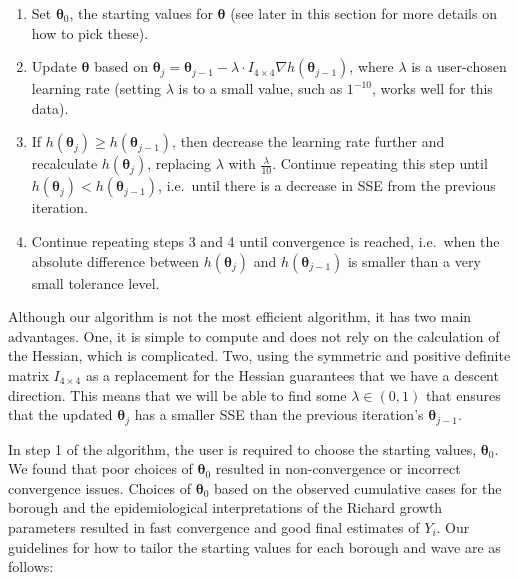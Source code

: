 \documentclass[
]{article}
\providecommand{\tightlist}{%
  \setlength{\itemsep}{0pt}\setlength{\parskip}{0pt}}
\begin{document}
\begin{enumerate}
\def\labelenumi{\arabic{enumi}.}
\tightlist
\item
  Set \(\boldsymbol{\theta}_0\), the starting values for
  \(\boldsymbol{\theta}\) (see later in this section for more details on
  how to pick these).
\item
  Update \(\boldsymbol{\theta}\) based on
  \(\boldsymbol{\theta}_{j} = \boldsymbol{\theta}_{j-1} - \lambda \cdot I_{4 \times 4} \nabla h(\boldsymbol{\theta}_{j-1})\),
  where \(\lambda\) is a user-chosen learning rate (setting \(\lambda\)
  is to a small value, such as \(1^{-10}\), works well for this data).
\item
  If \(h(\boldsymbol{\theta}_j) \geq h(\boldsymbol{\theta}_{j-1})\),
  then decrease the learning rate further and recalculate
  \(h(\boldsymbol{\theta}_j)\), replacing \(\lambda\) with
  \(\frac{\lambda}{10}\). Continue repeating this step until
  \(h(\boldsymbol{\theta}_j) < h(\boldsymbol{\theta}_{j-1})\),
  i.e.~until there is a decrease in SSE from the previous iteration.
\item
  Continue repeating steps 3 and 4 until convergence is reached,
  i.e.~when the absolute difference between \(h(\boldsymbol{\theta}_j)\)
  and \(h(\boldsymbol{\theta}_{j-1})\) is smaller than a very small
  tolerance level.
\end{enumerate}

Although our algorithm is not the most efficient algorithm, it has two
main advantages. One, it is simple to compute and does not rely on the
calculation of the Hessian, which is complicated. Two, using the
symmetric and positive definite matrix \(I_{4 \times 4}\) as a
replacement for the Hessian guarantees that we have a descent direction.
This means that we will be able to find some \(\lambda \in (0, 1)\) that
ensures that the updated \(\boldsymbol{\theta}_j\) has a smaller SSE
than the previous iteration's \(\boldsymbol{\theta}_{j-1}\).

In step 1 of the algorithm, the user is required to choose the starting
values, \(\boldsymbol{\theta}_0\). We found that poor choices of
\(\boldsymbol{\theta}_0\) resulted in non-convergence or incorrect
convergence issues. Choices of \(\boldsymbol{\theta}_0\) based on the
observed cumulative cases for the borough and the epidemiological
interpretations of the Richard growth parameters resulted in fast
convergence and good final estimates of \(Y_i\). Our guidelines for how
to tailor the starting values for each borough and wave are as follows:
\end{document}
